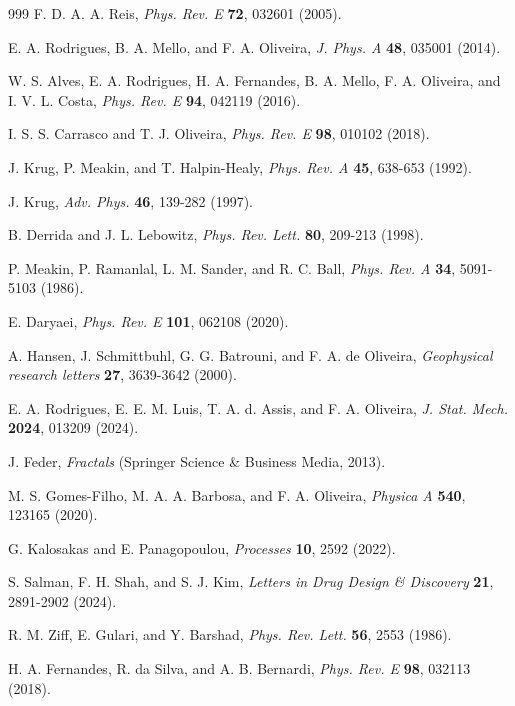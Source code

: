\documentclass[pre,aps,twocolumn,showpacs,floatfix,nofootinbib,superscriptaddress,linenumbers]{revtex4-1}
\begin{document}
\begin{thebibliography}{999}
 F. D. A. A. Reis, \textit{Phys. Rev. E} \textbf{72}, 032601 (2005).

 E. A. Rodrigues, B. A. Mello, and F. A. Oliveira, \textit{J. Phys. A} \textbf{48}, 035001 (2014).

 W. S. Alves, E. A. Rodrigues, H. A. Fernandes, B. A. Mello, F. A. Oliveira, and I. V. L. Costa, \textit{Phys. Rev. E} \textbf{94}, 042119 (2016).

 I. S. S. Carrasco and T. J. Oliveira, \textit{Phys. Rev. E} \textbf{98}, 010102 (2018).

 J. Krug, P. Meakin, and T. Halpin-Healy, \textit{Phys. Rev. A} \textbf{45}, 638-653 (1992).

 J. Krug, \textit{Adv. Phys.} \textbf{46}, 139-282 (1997).

 B. Derrida and J. L. Lebowitz, \textit{Phys. Rev. Lett.} \textbf{80}, 209-213 (1998).

 P. Meakin, P. Ramanlal, L. M. Sander, and R. C. Ball, \textit{Phys. Rev. A} \textbf{34}, 5091-5103 (1986).

 E. Daryaei, \textit{Phys. Rev. E} \textbf{101}, 062108 (2020).

 A. Hansen, J. Schmittbuhl, G. G. Batrouni, and F. A. de Oliveira, \textit{Geophysical research letters} \textbf{27}, 3639-3642 (2000).

 E. A. Rodrigues, E. E. M. Luis, T. A. d. Assis, and F. A. Oliveira, \textit{J. Stat. Mech.} \textbf{2024}, 013209 (2024).

 J. Feder, \textit{Fractals} (Springer Science \& Business Media, 2013).

 M. S. Gomes-Filho, M. A. A. Barbosa, and F. A. Oliveira, \textit{Physica A} \textbf{540}, 123165 (2020).

 G. Kalosakas and E. Panagopoulou, \textit{Processes} \textbf{10}, 2592 (2022).

 S. Salman, F. H. Shah, and S. J. Kim, \textit{Letters in Drug Design \& Discovery} \textbf{21}, 2891-2902 (2024).

 R. M. Ziff, E. Gulari, and Y. Barshad, \textit{Phys. Rev. Lett.} \textbf{56}, 2553 (1986).

 H. A. Fernandes, R. da Silva, and A. B. Bernardi, \textit{Phys. Rev. E} \textbf{98}, 032113 (2018).


\end{thebibliography}
\end{document}
